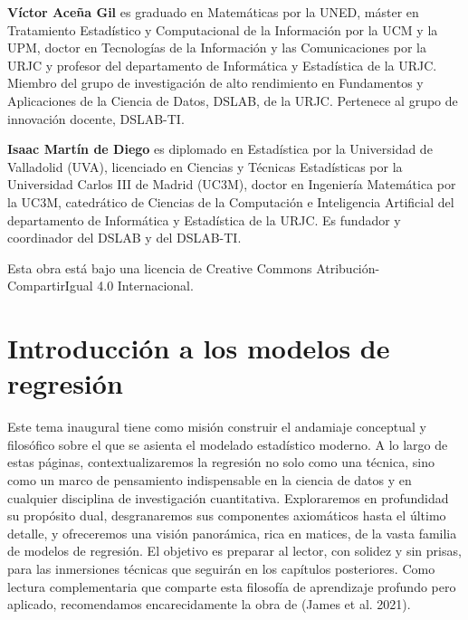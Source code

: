 \documentclass[
  letterpaper,
  DIV=11,
  numbers=noendperiod]{scrreprt}
\begin{document}
\begin{tcolorbox}[enhanced jigsaw, leftrule=.75mm, breakable, colbacktitle=quarto-callout-note-color!10!white, bottomrule=.15mm, colframe=quarto-callout-note-color-frame, toprule=.15mm, colback=white, coltitle=black, bottomtitle=1mm, left=2mm, title=\textcolor{quarto-callout-note-color}{\faInfo}\hspace{0.5em}{Sobre los autores}, opacityback=0, arc=.35mm, opacitybacktitle=0.6, toptitle=1mm, titlerule=0mm, rightrule=.15mm]

\textbf{Víctor Aceña Gil} es graduado en Matemáticas por la UNED, máster
en Tratamiento Estadístico y Computacional de la Información por la UCM
y la UPM, doctor en Tecnologías de la Información y las Comunicaciones
por la URJC y profesor del departamento de Informática y Estadística de
la URJC. Miembro del grupo de investigación de alto rendimiento en
Fundamentos y Aplicaciones de la Ciencia de Datos, DSLAB, de la URJC.
Pertenece al grupo de innovación docente, DSLAB-TI.

\textbf{Isaac Martín de Diego} es diplomado en Estadística por la
Universidad de Valladolid (UVA), licenciado en Ciencias y Técnicas
Estadísticas por la Universidad Carlos III de Madrid (UC3M), doctor en
Ingeniería Matemática por la UC3M, catedrático de Ciencias de la
Computación e Inteligencia Artificial del departamento de Informática y
Estadística de la URJC. Es fundador y coordinador del DSLAB y del
DSLAB-TI.

\end{tcolorbox}

Esta obra está bajo una licencia de Creative Commons
Atribución-CompartirIgual 4.0 Internacional.


\chapter{Introducción a los modelos de regresión}\label{sec-intro}

Este tema inaugural tiene como misión construir el andamiaje conceptual
y filosófico sobre el que se asienta el modelado estadístico moderno. A
lo largo de estas páginas, contextualizaremos la regresión no solo como
una técnica, sino como un marco de pensamiento indispensable en la
ciencia de datos y en cualquier disciplina de investigación
cuantitativa. Exploraremos en profundidad su propósito dual,
desgranaremos sus componentes axiomáticos hasta el último detalle, y
ofreceremos una visión panorámica, rica en matices, de la vasta familia
de modelos de regresión. El objetivo es preparar al lector, con solidez
y sin prisas, para las inmersiones técnicas que seguirán en los
capítulos posteriores. Como lectura complementaria que comparte esta
filosofía de aprendizaje profundo pero aplicado, recomendamos
encarecidamente la obra de (James et al. 2021).
\end{document}
